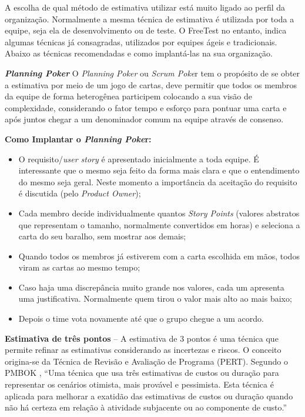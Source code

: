 A escolha de qual método de estimativa utilizar está muito ligado ao perfil da organização. Normalmente a mesma técnica de estimativa é utilizada por toda a equipe, seja ela de desenvolvimento ou de teste. O FreeTest no entanto, indica algumas técnicas já consagradas, utilizados por equipes ágeis e tradicionais. Abaixo as técnicas recomendadas e como implantá-las na sua organização.

\textbf{\textit{Planning Poker}}\cite{Cohn2005} O \textit{Planning Poker} ou \textit{Scrum Poke}r tem o propósito de se obter a estimativa por meio de um jogo de cartas, deve permitir que todos os membros da equipe de forma heterogênea participem colocando a sua visão de complexidade, considerando o fator tempo e esforço para pontuar uma carta e após juntos chegar a um denominador comum na equipe através de consenso.

\textbf{Como Implantar o \textit{Planning Poke}r:}
\begin{itemize}
    \item O requisito/\textit{user story} é apresentado inicialmente a toda equipe. É interessante que o mesmo seja feito da forma mais clara e que o entendimento do mesmo seja geral. Neste momento a importância da aceitação do requisito é discutida (pelo \textit{Product Owner});
    \item Cada membro decide individualmente quantos \textit{Story Points} (valores abstratos que representam o tamanho, normalmente convertidos em horas) e seleciona a carta do seu baralho, sem mostrar aos demais;
    \item Quando todos os membros já estiverem com a carta escolhida em mãos, todos viram as cartas ao mesmo tempo;
    \item Caso haja uma discrepância muito grande nos valores, cada um apresenta uma justificativa. Normalmente quem tirou o valor mais alto ao mais baixo;
    \item Depois o time vota novamente até que o grupo chegue a um acordo.
\end{itemize}

\textbf{Estimativa de três pontos} – A estimativa de 3 pontos é uma técnica que permite refinar as estimativas considerando as incertezas e riscos. O conceito origina-se da Técnica de Revisão e Avaliação de Programa (PERT). Segundo o PMBOK \cite{pmbok2014}, “Uma técnica que usa três estimativas de custos ou duração para representar os cenários otimista, mais provável e pessimista. Esta técnica é aplicada para melhorar a exatidão das estimativas de custos ou duração quando não há certeza em relação à atividade subjacente ou ao componente de custo.”

